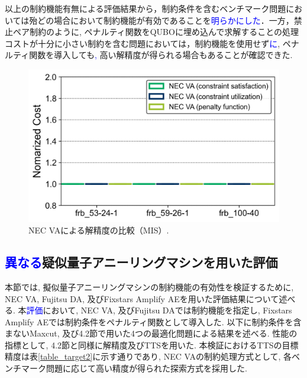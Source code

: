 \documentclass[submit,techrep,noauthor]{ipsj}
\begin{document}
以上の制約機能有無による評価結果から，制約条件を含むベンチマーク問題においては殆どの場合において制約機能が有効であることを\textcolor{blue}{明らかにした}．一方，禁止ペア制約のように, ペナルティ関数をQUBOに埋め込んで求解することの処理コストが十分に小さい制約を含む問題においては，制約機能を使用せず\textcolor{blue}{に}, ペナルティ関数を導入しても\textcolor{blue}{, }高い解精度が得られる場合もあることが確認できた.

\begin{figure}[tb]
\centering
\includegraphics[bb=0 0 700 230, width=15cm]{Cost_MIS_VA.png}
\caption{NEC VAによる解精度の比較（MIS）.}
\label{Cost_MIS_VA}
\end{figure}


\subsection{\textcolor{blue}{異なる}疑似量子アニーリングマシンを用いた評価}
本節では, 擬似量子アニーリングマシンの制約機能の有効性を検証するために, NEC VA, Fujitsu DA, 及びFixstars Amplify AEを用いた評価結果について述べる. 本\textcolor{blue}{評価}において, NEC VA, 及びFujitsu DAでは制約機能を指定し, Fixstars Amplify AEでは制約条件をペナルティ関数として導入した. 以下に制約条件を含まないMaxcut, 及び4.2節で用いた4つの最適化問題による結果を述べる. 性能の指標として, 4.2節と同様に解精度及びTTSを用いた. 本検証におけるTTSの目標精度は表\ref{table_target2}に示す通りであり, NEC VAの制約処理方式として, 各ベンチマーク問題に応じて高い精度が得られた探索方式を採用した.
\end{document}
